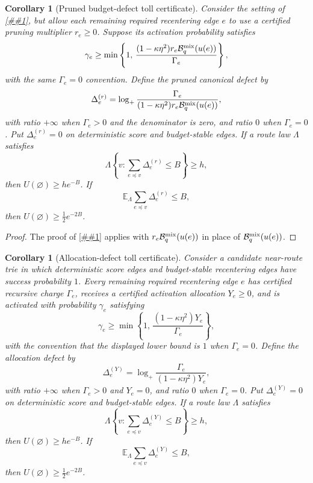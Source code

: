 \documentclass[10pt]{article}
\newcommand{\cref}[1]{\ref{##1}}
\newtheorem{corollary}[theorem]{Corollary}
\theoremstyle{definition}
\newcommand{\E}{\mathbb{E}}
\begin{document}
\begin{corollary}[Pruned budget-defect toll certificate]
   \label{cor:pruned-budget-defect-toll}
   Consider the setting of \cref{cor:canonical-budget-defect-toll}, but allow
   each remaining required recentering edge \(e\) to use a certified pruning
   multiplier \(r_e\ge0\).  Suppose its activation probability satisfies
   \[
      \gamma_e\ge
      \min\left\{
         1,\,
         \frac{(1-\kappa\eta^2)r_e
               \mathcal B_q^{\rm mix}(u(e))}
              {\Gamma_e}
      \right\},
   \]
   with the same \(\Gamma_e=0\) convention. Define the pruned canonical defect
   by
   \[
      \Delta^{(r)}_e
      =
      \log_+
      \frac{\Gamma_e}
           {(1-\kappa\eta^2)r_e\mathcal B_q^{\rm mix}(u(e))},
   \]
   with ratio \(+\infty\) when \(\Gamma_e>0\) and the denominator is zero, and
   ratio \(0\) when \(\Gamma_e=0\). Put \(\Delta^{(r)}_e=0\) on deterministic
   score and budget-stable edges. If a route law \(\Lambda\) satisfies
   \[
      \Lambda\left\{v:\sum_{e\preceq v}\Delta^{(r)}_e\le B\right\}\ge h,
   \]
   then \(U(\varnothing)\ge he^{-B}\). If
   \[
      \E_\Lambda\sum_{e\preceq v}\Delta^{(r)}_e\le B,
   \]
   then \(U(\varnothing)\ge \frac12e^{-2B}\).
\end{corollary}

\begin{proof}
   The proof of \cref{cor:canonical-budget-defect-toll} applies with
   \(r_e\mathcal B_q^{\rm mix}(u(e))\) in place of
   \(\mathcal B_q^{\rm mix}(u(e))\).
\end{proof}

\begin{corollary}[Allocation-defect toll certificate]
   \label{cor:allocation-defect-toll}
   Consider a candidate near-route trie in which deterministic score edges and
   budget-stable recentering edges have success probability \(1\). Every
   remaining required recentering edge \(e\) has certified recursive charge
   \(\Gamma_e\), receives a certified activation allocation \(Y_e\ge0\), and
   is activated with probability \(\gamma_e\) satisfying
   \[
      \gamma_e\ge
      \min\left\{
         1,\,
         \frac{(1-\kappa\eta^2)Y_e}{\Gamma_e}
      \right\},
   \]
   with the convention that the displayed lower bound is \(1\) when
   \(\Gamma_e=0\). Define the allocation defect by
   \[
      \Delta^{(Y)}_e
      =
      \log_+
      \frac{\Gamma_e}{(1-\kappa\eta^2)Y_e},
   \]
   with ratio \(+\infty\) when \(\Gamma_e>0\) and \(Y_e=0\), and ratio \(0\)
   when \(\Gamma_e=0\). Put \(\Delta^{(Y)}_e=0\) on deterministic score and
   budget-stable edges. If a route law \(\Lambda\) satisfies
   \[
      \Lambda\left\{v:\sum_{e\preceq v}\Delta^{(Y)}_e\le B\right\}\ge h,
   \]
   then \(U(\varnothing)\ge he^{-B}\). If
   \[
      \E_\Lambda\sum_{e\preceq v}\Delta^{(Y)}_e\le B,
   \]
   then \(U(\varnothing)\ge \frac12e^{-2B}\).
\end{corollary}
\end{document}
